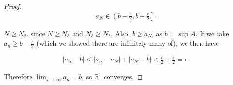 \documentclass[12pt]{article}
\begin{document}
\begin{thm}
\begin{proof}
    \begin{align*}
      a_N \in \left( b - \frac{\epsilon}{2}, b + \frac{\epsilon}{2} \right].
    \end{align*}

    $N \geq N_2$, since $N \geq N_3$ and $N_3 \geq N_2$. Also, $b \geq a_{N_2}$ as $b
    = \sup A$. If we take $a_n \geq b - \frac{\epsilon}{2}$ (which we showed there
    are infinitely many of), we then have

    \begin{align*}
      |a_n - b| \leq |a_n - a_N| + |a_N - b| < \frac{\epsilon}{2} + \frac{\epsilon}{2} = \epsilon.
    \end{align*}

    Therefore $\lim_{n \to \infty} a_n = b$, so $\mathbb{R}^1$ converges.
  \end{proof}
\end{thm}
\end{document}
